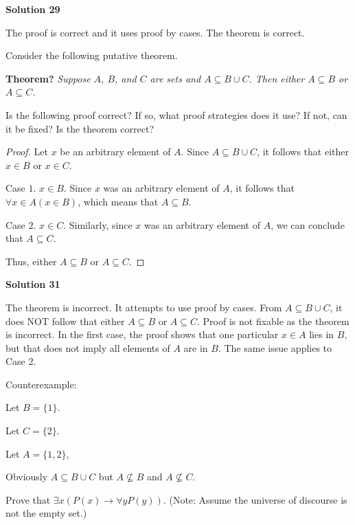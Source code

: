 \textbf{Solution 29}

The proof is correct and it uses proof by cases. The theorem is correct.

\begin{tcolorbox}[title=Problem 31, breakable]
    Consider the following putative theorem.

    \textbf{Theorem?} \emph{Suppose $A$, $B$, and $C$ are sets and $A \subseteq B \cup C$.
        Then either $A \subseteq B$ or $A \subseteq C$.}

    Is the following proof correct? If so, what proof strategies does it use? If
    not, can it be fixed? Is the theorem correct?

    \begin{proof}
        Let $x$ be an arbitrary element of $A$. Since $A \subseteq B \cup C$, it follows
        that either $x \in B$ or $x \in C$.

        Case $1$. $x \in B$. Since $x$ was an arbitrary element of $A$, it follows that
        $\forall{x \in A}(x \in B)$, which means that $A \subseteq B$.

        Case $2$. $x \in C$. Similarly, since $x$ was an arbitrary element of $A$, we
        can conclude that $A \subseteq C$.

        Thus, either $A \subseteq B$ or $A \subseteq C$.
    \end{proof}
\end{tcolorbox}

\textbf{Solution 31}

The theorem is incorrect. It attempts to use proof by cases. From $A \subseteq
    B \cup C$, it does NOT follow that either $A \subseteq B$ or $A \subseteq C$.
Proof is not fixable as the theorem is incorrect. In the first case, the proof
shows that one particular $x \in A$ lies in $B$, but that does not imply all
elements of $A$ are in $B$. The same issue applies to Case 2.

Counterexample:

Let $B = \{1\}$.

Let $C = \{2\}$.

Let $A = \{1, 2\}$,

Obviously $A \subseteq B \cup C$ but $A \not \subseteq B$ and $A \not \subseteq
    C$.

\begin{tcolorbox}[title=Problem 33, breakable]
    Prove that $\exists{x}(P(x) \rightarrow \forall{y}P(y))$. (Note: Assume the universe of discourse
    is not the empty set.)
\end{tcolorbox}

